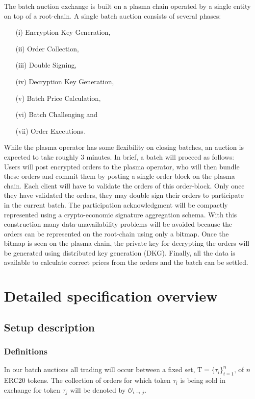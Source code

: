 \documentclass[11pt,parskip=full]{scrartcl}%
\newcommand{\Tau}{\mathrm{T}}
\def\pO{\mathcal{O}}
\def\ra{\rightarrow}
\newcommand*{\erc}{ERC20 }
\begin{document}
The batch auction exchange is built on a plasma chain operated by a single entity on top of a root-chain. A single batch auction consists of several phases:
\begin{itemize}
\item[(i)] Encryption Key Generation, 
\item[(ii)] Order Collection, 
\item[(iii)] Double Signing, 
\item[(iv)] Decryption Key Generation,
\item[(v)] Batch Price Calculation,
\item[(vi)] Batch Challenging and 
\item[(vii)] Order Executions. 
\end{itemize}
While the plasma operator has some flexibility on closing batches, an auction is expected to take roughly 3 minutes.
In brief, a batch will proceed as follows: Users will post encrypted orders to the plasma operator, who will then bundle these orders and commit them by posting a single order-block on the plasma chain.
Each client will have to validate the orders of this order-block. Only once they have validated the orders, they may double sign their orders to participate in the current batch.
The participation acknowledgment will be compactly represented using a crypto-economic signature aggregation schema. With this construction many data-unavailability problems will be avoided because the orders can be represented on the root-chain using only a bitmap.
Once the bitmap is seen on the plasma chain, the private key for decrypting the orders will be generated using distributed key generation (DKG). Finally, all the data is available to calculate correct prices from the orders and the batch can be settled. 


\newpage

\section{Detailed specification overview}
\subsection{Setup description}

\subsubsection{Definitions}


In our batch auctions all trading will occur between a fixed set, $\Tau = \{\tau_i\}_{i=1}^n$, of $n$ \erc tokens. The collection of orders for which token $\tau_i$ is being sold in exchange for token $\tau_j$ will be denoted by $\pO_{i\ra j}$. 
\end{document}
